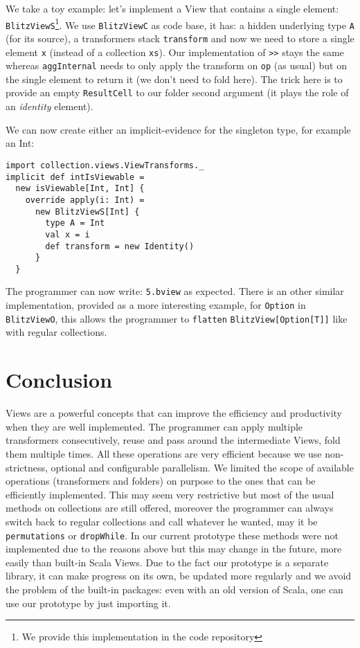 \documentclass[a4paper,12pt,twocolumn]{article}
\begin{document}
We take a toy example: let's implement a View that contains a single element: \verb|BlitzViewS|\footnote{We provide this implementation in the code repository}.
We use \verb|BlitzViewC| as code base, it has: a hidden underlying type \verb|A| (for its source), a transformers stack \verb|transform| and now we need to store a single element \verb|x| (instead of a collection \verb|xs|).
Our implementation of \verb|>>| stays the same whereas \verb|aggInternal| needs to only apply the transform on \verb|op| (as usual) but on the single element to return it (we don't need to fold here).
The trick here is to provide an empty \verb|ResultCell| to our folder second argument (it plays the role of an {\it identity} element).

We can now create either an implicit-evidence for the singleton type, for example an Int:
\begin{lstlisting}
import collection.views.ViewTransforms._
implicit def intIsViewable =
  new isViewable[Int, Int] {
    override apply(i: Int) =
      new BlitzViewS[Int] {
        type A = Int
        val x = i
        def transform = new Identity()
      }
  }
\end{lstlisting}
The programmer can now write: \verb|5.bview| as expected.
There is an other similar implementation, provided as a more interesting example, for \verb|Option| in \verb|BlitzViewO|, this allows the programmer to \verb|flatten| \verb|BlitzView[Option[T]]| like with regular collections.

\section{Conclusion}
Views are a powerful concepts that can improve the efficiency and productivity when they are well implemented.
The programmer can apply multiple transformers consecutively, reuse and pass around the intermediate Views, fold them multiple times.
All these operations are very efficient because we use non-strictness, optional and configurable parallelism.
We limited the scope of available operations (transformers and folders) on purpose to the ones that can be efficiently implemented.
This may seem very restrictive but most of the usual methods on collections are still offered, moreover the programmer can always switch back to regular collections and call whatever he wanted, may it be \verb|permutations| or \verb|dropWhile|.
In our current prototype these methods were not implemented due to the reasons above but this may change in the future, more easily than built-in Scala Views.
Due to the fact our prototype is a separate library, it can make progress on its own, be updated more regularly and we avoid the problem of the built-in packages: even with an old version of Scala, one can use our prototype by just importing it.
\end{document}
